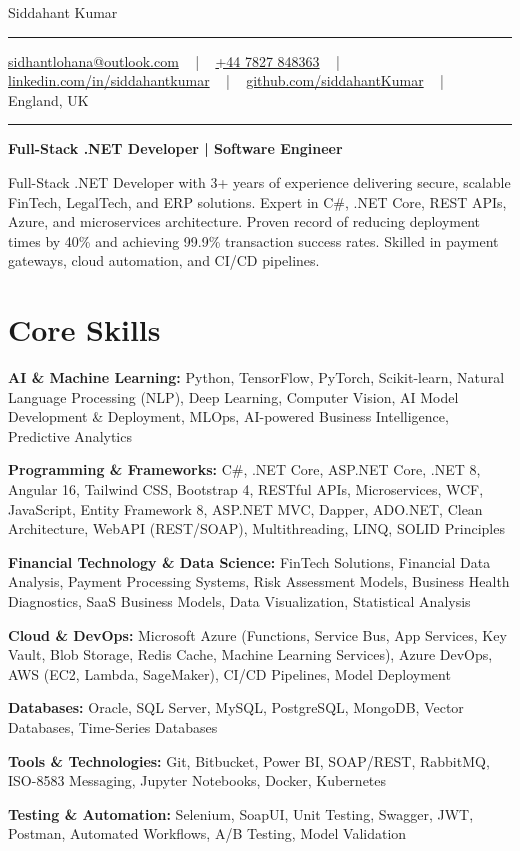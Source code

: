 \documentclass[letterpaper,10pt]{article}
\newcommand{\documentTitle}[2]{
  \begin{center}
    \vspace*{-0.3in}
    {\Huge\color{accentTitle} #1}
    \vspace{8pt}
    {\color{accentLine} \hrule}
    \vspace{2pt}
    \footnotesize{#2}
    \vspace{2pt}
    {\color{accentLine} \hrule}
  \end{center}
}
\newenvironment{resume_list}{
  \vspace{-7pt}
  \begin{itemize}[itemsep=-2px, parsep=1pt, leftmargin=30pt]
}{
  \end{itemize}
}
\begin{document}
\documentTitle{Siddahant Kumar}{
\vspace{0.1cm}
\href{mailto:sidhantlohana@outlook.com}{sidhantlohana@outlook.com} ~ | ~
\href{tel:+447827848363}{+44 7827 848363} ~ | ~
\href{https://www.linkedin.com/in/siddahantkumar/}{linkedin.com/in/siddahantkumar} ~ | ~
\href{https://github.com/siddahantKumar}{github.com/siddahantKumar} ~ | ~
England, UK
}

\begin{center}
\textbf{Full-Stack .NET Developer | Software Engineer}
\end{center}

Full-Stack .NET Developer with 3+ years of experience delivering secure, scalable FinTech, LegalTech, and ERP solutions. Expert in C\#, .NET Core, REST APIs, Azure, and microservices architecture. Proven record of reducing deployment times by 40\% and achieving 99.9\% transaction success rates. Skilled in payment gateways, cloud automation, and CI/CD pipelines.


\section{Core Skills}

\begin{resume_list}
    \item \textbf{AI \& Machine Learning:} Python, TensorFlow, PyTorch, Scikit-learn, Natural Language Processing (NLP), Deep Learning, Computer Vision, AI Model Development \& Deployment, MLOps, AI-powered Business Intelligence, Predictive Analytics
    \item \textbf{Programming \& Frameworks:} C\#, .NET Core, ASP.NET Core, .NET 8, Angular 16, Tailwind CSS, Bootstrap 4, RESTful APIs, Microservices, WCF, JavaScript, Entity Framework 8, ASP.NET MVC, Dapper, ADO.NET, Clean Architecture, WebAPI (REST/SOAP), Multithreading, LINQ, SOLID Principles
    \item \textbf{Financial Technology \& Data Science:} FinTech Solutions, Financial Data Analysis, Payment Processing Systems, Risk Assessment Models, Business Health Diagnostics, SaaS Business Models, Data Visualization, Statistical Analysis
    \item \textbf{Cloud \& DevOps:} Microsoft Azure (Functions, Service Bus, App Services, Key Vault, Blob Storage, Redis Cache, Machine Learning Services), Azure DevOps, AWS (EC2, Lambda, SageMaker), CI/CD Pipelines, Model Deployment
    \item \textbf{Databases:} Oracle, SQL Server, MySQL, PostgreSQL, MongoDB, Vector Databases, Time-Series Databases
    \item \textbf{Tools \& Technologies:} Git, Bitbucket, Power BI, SOAP/REST, RabbitMQ, ISO-8583 Messaging, Jupyter Notebooks, Docker, Kubernetes
    \item \textbf{Testing \& Automation:} Selenium, SoapUI, Unit Testing, Swagger, JWT, Postman, Automated Workflows, A/B Testing, Model Validation
\end{resume_list}
\end{document}
